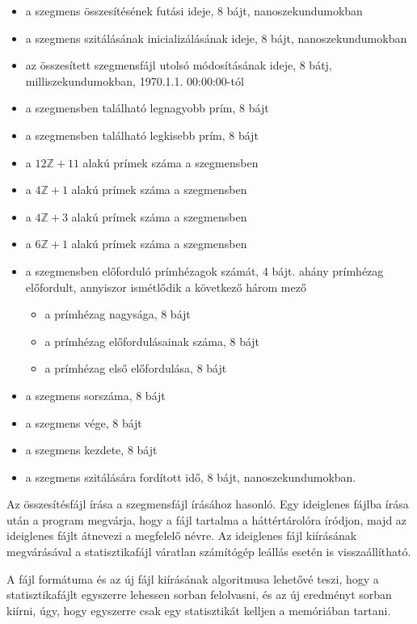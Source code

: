 \begin{itemize}
\item a szegmens összesítésének futási ideje, 8 bájt, nanoszekundumokban
\item a szegmens szitálásának inicializálásának ideje, 8 bájt, nanoszekundumokban
\item az összesített szegmensfájl utolsó módosításának ideje, 8 bátj, milliszekundumokban, 1970.1.1. 00:00:00-tól
\item a szegmensben található legnagyobb prím, 8 bájt
\item a szegmensben található legkisebb prím, 8 bájt
\item a $12\mathbb{Z}+11$ alakú prímek száma a szegmensben
\item a $4\mathbb{Z}+1$ alakú prímek száma a szegmensben
\item a $4\mathbb{Z}+3$ alakú prímek száma a szegmensben
\item a $6\mathbb{Z}+1$ alakú prímek száma a szegmensben
\item a szegmensben előforduló prímhézagok számát, 4 bájt. ahány prímhézag előfordult, annyiszor ismétlődik a következő három mező
\begin{itemize}
\item a prímhézag nagysága, 8 bájt
\item a prímhézag előfordulásainak száma, 8 bájt
\item a prímhézag első előfordulása, 8 bájt
\end{itemize}
\item a szegmens sorszáma, 8 bájt
\item a szegmens vége, 8 bájt
\item a szegmens kezdete, 8 bájt
\item a szegmens szitálására fordított idő, 8 bájt, nanoszekundumokban.
\end{itemize}

Az összesítésfájl írása a szegmensfájl írásához hasonló.
Egy ideiglenes fájlba írása után a program megvárja, hogy a fájl tartalma a háttértárolóra íródjon, majd az ideiglenes fájlt átnevezi a megfelelő névre.
Az ideiglenes fájl kiírásának megvárásával a statisztikafájl váratlan számítógép leállás esetén is visszaállítható.

A fájl formátuma és az új fájl kiírásának algoritmusa lehetővé teszi, hogy a statisztikafájlt egyszerre lehessen sorban felolvasni, és az új eredményt sorban kiírni, úgy, hogy egyszerre csak egy statisztikát kelljen a memóriában tartani.

